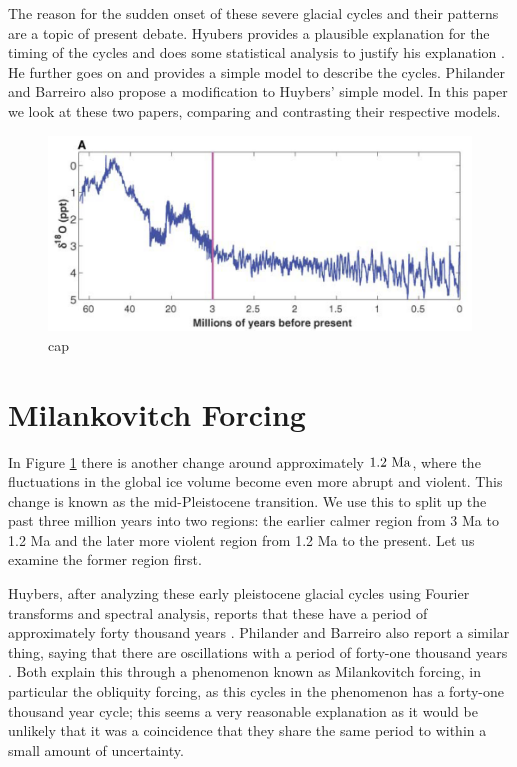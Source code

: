 \documentclass[11pt]{article}
\begin{document}
The reason for the sudden onset of these severe glacial cycles and their patterns are a topic of present debate.
Hyubers provides a plausible explanation for the timing of the cycles and does some statistical analysis to justify his explanation \cite{huybers}.
He further goes on and provides a simple model to describe the cycles.
Philander and Barreiro also propose a modification to Huybers' simple model.
In this paper we look at these two papers, comparing and contrasting their respective models.

\begin{figure}
  \centering
  \includegraphics[width=6in]{d18o.png}
  \caption{cap}
  \label{d18o}
\end{figure}

\section{Milankovitch Forcing}
In Figure \ref{d18o} there is another change around approximately $1.2~\textnormal{Ma}$, where the fluctuations in the global ice volume become even more abrupt and violent.
This change is known as the mid-Pleistocene transition.
We use this to split up the past three million years into two regions: the earlier calmer region from 3 Ma to 1.2 Ma and the later more violent region from 1.2 Ma to the present.
Let us examine the former region first.

Huybers, after analyzing these early pleistocene glacial cycles using Fourier transforms and spectral analysis, reports that these have a period of approximately forty thousand years \cite{huybers}.
Philander and Barreiro also report a similar thing, saying that there are oscillations with a period of forty-one thousand years \cite{philander}.
Both explain this through a phenomenon known as Milankovitch forcing, in particular the obliquity forcing, as this cycles in the phenomenon has a forty-one thousand year cycle; this seems a very reasonable explanation as it would be unlikely that it was a coincidence that they share the same period to within a small amount of uncertainty.
\end{document}
